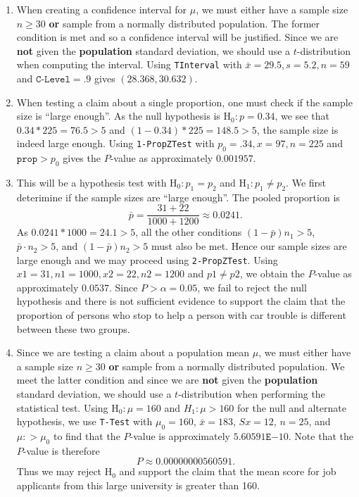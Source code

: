 \documentclass{article}
\newcommand{\answer}[1]{{\color{red}{\large \textbf{#1}}}}
\begin{document}
\begin{enumerate}
\item \answer{D} When creating a confidence interval for $\mu$, we must either have a sample size $n\geq 30$ \textbf{or} sample from a normally distributed population. The former condition is met and so a confidence interval will be justified. Since we are \textbf{not} given the \textbf{population} standard deviation, we should use a $t$-distribution when computing the interval. Using \texttt{TInterval} with $\bar{x} = 29.5, s=5.2, n=59$ and $\texttt{C-Level} = .9$ gives $(28.368, 30.632)$.

\item \answer{C} When testing a claim about a single proportion, one must check if the sample size is ``large enough''. As the null hypothesis is $\text{H}_0: p = 0.34$, we see that $0.34*225 = 76.5 > 5$ and $(1-0.34)*225 = 148.5 > 5$, the sample size is indeed large enough. Using \texttt{1-PropZTest} with $p_0 = .34, x=97, n=225$ and $\texttt{prop} > p_0$ gives the $P$-value as approximately $0.001957$.

\newpage

\item \answer{Fail to Reject $\text{H}_0$.} This will be a hypothesis test with $\text{H}_0: p_1 = p_2$ and $\text{H}_1: p_1 \neq p_2$. We first deterimine if the sample sizes are ``large enough''. The pooled proportion is $$\bar{p}=\frac{31+22}{1000+1200} \approx 0.0241.$$ As $0.0241 * 1000 = 24.1 >5$, all the other conditions $(1-\bar{p})n_1 > 5$, $\bar{p}\cdot n_2 > 5$, and $(1-\bar{p})n_2 > 5$ must also be met. Hence our sample sizes are large enough and we may proceed using \texttt{2-PropZTest}. Using $x1 = 31, n1 = 1000, x2=22, n2=1200$ and $p1 \neq p2$, we obtain the $P$-value as approximately $0.0537$. Since $P > \alpha = 0.05$, we fail to reject the null hypothesis and there is not sufficient evidence to support the claim that the proportion of persons who stop to help a person with car trouble is different between these two groups.

\item \answer{Reject $\text{H}_0$.} Since we are testing a claim about a population mean $\mu$, we must either have a sample size $n\geq  30$ \textbf{or} sample from a normally distributed population. We meet the latter condition and since we are \textbf{not} given the \textbf{population} standard deviation, we should use a $t$-distribution when performing the statistical test. Using $\text{H}_0: \mu = 160$ and $H_1: \mu > 160$ for the null and alternate hypothesis, we use \texttt{T-Test} with $\mu_0 =160$, $\bar{x} = 183$, $Sx = 12$, $n=25$, and $\mu: > \mu_0$ to find that the $P$-value is approximately $5.60591 \texttt{E}{-10}$. Note that the $P$-value is therefore
$$P \approx 0.00000000560591.$$
Thus we may reject $\text{H}_0$ and support the claim that the mean score for job applicants from this large university is greater than 160.


\end{enumerate}
\end{document}
